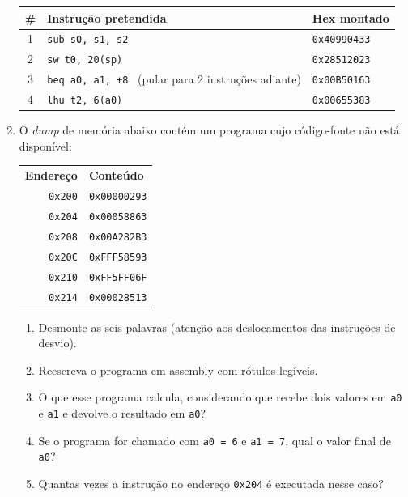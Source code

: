 \documentclass[11pt, a4paper]{article}
\begin{document}
\begin{enumerate}
\begin{center}
\small
\begin{tabular}{cll}
\toprule
\# & \textbf{Instru\c{c}\~{a}o pretendida} & \textbf{Hex montado}\\
\midrule
1 & \texttt{sub s0, s1, s2} & \texttt{0x40990433}\\
2 & \texttt{sw t0, 20(sp)} & \texttt{0x28512023}\\
3 & \texttt{beq a0, a1, +8} \ (pular para 2 instru\c{c}\~{o}es adiante) & \texttt{0x00B50163}\\
4 & \texttt{lhu t2, 6(a0)} & \texttt{0x00655383}\\
\bottomrule
\end{tabular}
\end{center}

\item O \emph{dump} de mem\'{o}ria abaixo cont\'{e}m um programa cujo c\'{o}digo-fonte n\~{a}o est\'{a} dispon\'{i}vel:

\begin{center}
\small
\begin{tabular}{rl}
\textbf{Endere\c{c}o} & \textbf{Conte\'{u}do}\\
\texttt{0x200} & \texttt{0x00000293}\\
\texttt{0x204} & \texttt{0x00058863}\\
\texttt{0x208} & \texttt{0x00A282B3}\\
\texttt{0x20C} & \texttt{0xFFF58593}\\
\texttt{0x210} & \texttt{0xFF5FF06F}\\
\texttt{0x214} & \texttt{0x00028513}\\
\end{tabular}
\end{center}

\begin{enumerate}
  \item Desmonte as seis palavras (aten\c{c}\~{a}o aos deslocamentos das instru\c{c}\~{o}es de desvio).
  \item Reescreva o programa em assembly com r\'{o}tulos leg\'{i}veis.
  \item O que esse programa calcula, considerando que recebe dois valores em \texttt{a0} e \texttt{a1} e devolve o resultado em \texttt{a0}?
  \item Se o programa for chamado com \texttt{a0 = 6} e \texttt{a1 = 7}, qual o valor final de \texttt{a0}?
  \item Quantas vezes a instru\c{c}\~{a}o no endere\c{c}o \texttt{0x204} \'{e} executada nesse caso?
\end{enumerate}


\end{enumerate}
\end{document}
